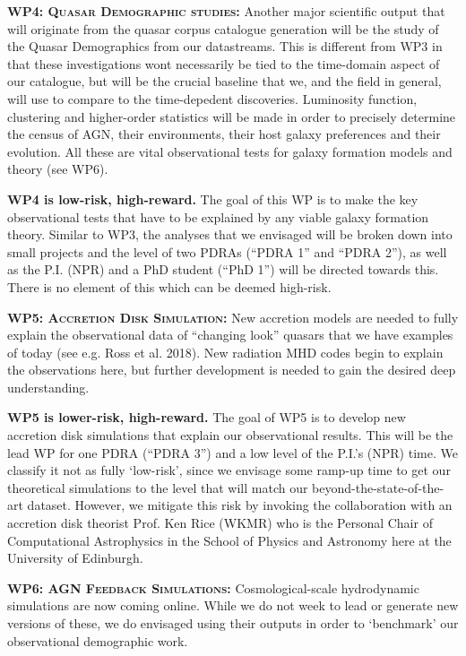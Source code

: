 \smallskip
\smallskip
\noindent
\textbf{\textsc{WP4: Quasar Demographic studies:}} 
Another major scientific output that will originate from the quasar
corpus catalogue generation will be the study of the Quasar
Demographics from our datastreams. This is different from WP3 in that
these investigations wont necessarily be tied to the time-domain
aspect of our catalogue, but will be the crucial baseline that we, and
the field in general, will use to compare to the time-depedent
discoveries. Luminosity function, clustering and higher-order
statistics will be made in order to precisely determine the census of
AGN, their environments, their host galaxy preferences and their
evolution. All these are vital observational tests for galaxy
formation models and theory (see WP6).

\noindent
{\bf WP4 is low-risk, high-reward.}
The goal of this WP is to make the key observational tests that have to be explained by any 
viable galaxy formation theory. 
Similar to WP3, the analyses that we envisaged will be broken down
into small projects and the level of two PDRAs (``PDRA 1'' and ``PDRA
2''), as well as the P.I. (NPR) and a PhD student (``PhD 1'') will be
directed towards this. There is no element of this which can be deemed
high-risk.


\smallskip
\smallskip
\noindent
\textbf{\textsc{WP5: Accretion Disk Simulation:}} 
New accretion models are needed to fully explain the observational
data of ``changing look'' quasars that we have examples of today (see
e.g. Ross et al. 2018). New radiation MHD codes begin to explain the
observations here, but further development is needed to gain the
desired deep understanding. 

\noindent
{\bf WP5 is lower-risk, high-reward.}
The goal of WP5 is to develop new accretion disk simulations that
explain our observational results.  This will be the lead WP for one
PDRA (``PDRA 3'') and a low level of the P.I.'s (NPR) time. We
classify it not as fully `low-risk', since we envisage some ramp-up
time to get our theoretical simulations to the level that will match
our beyond-the-state-of-the-art dataset. However, we mitigate this risk
by invoking the collaboration with an accretion disk theorist
Prof. Ken Rice (WKMR) who is the Personal Chair of Computational
Astrophysics in the School of Physics and Astronomy here at the
University of Edinburgh.


\smallskip
\smallskip
\noindent
\textbf{\textsc{WP6: AGN Feedback Simulations:}} 
Cosmological-scale hydrodynamic simulations are now coming online. 
While we do not week to lead or generate new versions of these, we do 
envisaged using their outputs in order to `benchmark' our observational 
demographic work. 

